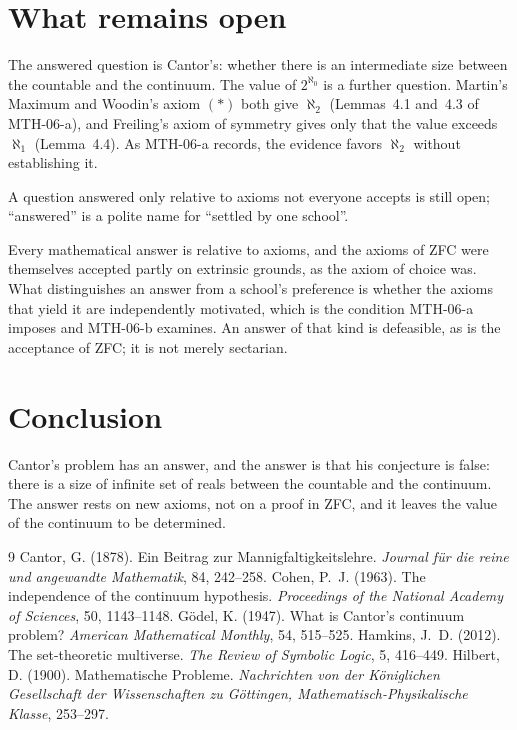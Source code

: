 \documentclass{situationist-preprint}
\begin{document}
\section{What remains open}\label{s:open}

The answered question is Cantor's: whether there is an intermediate size between the countable and the continuum. The value of $2^{\aleph_0}$ is a further question. Martin's Maximum and Woodin's axiom $(*)$ both give $\aleph_2$ (Lemmas~4.1 and~4.3 of MTH-06-a), and Freiling's axiom of symmetry gives only that the value exceeds $\aleph_1$ (Lemma~4.4). As MTH-06-a records, the evidence favors $\aleph_2$ without establishing it.

\begin{objection}
A question answered only relative to axioms not everyone accepts is still open; \enquote{answered} is a polite name for \enquote{settled by one school}.
\end{objection}

\begin{reply}
Every mathematical answer is relative to axioms, and the axioms of ZFC were themselves accepted partly on extrinsic grounds, as the axiom of choice was. What distinguishes an answer from a school's preference is whether the axioms that yield it are independently motivated, which is the condition MTH-06-a imposes and MTH-06-b examines. An answer of that kind is defeasible, as is the acceptance of ZFC; it is not merely sectarian.
\end{reply}

\section{Conclusion}

Cantor's problem has an answer, and the answer is that his conjecture is false: there is a size of infinite set of reals between the countable and the continuum. The answer rests on new axioms, not on a proof in ZFC, and it leaves the value of the continuum to be determined.

\begin{thebibliography}{9}\small
{} Cantor, G. (1878). Ein Beitrag zur Mannigfaltigkeitslehre. \emph{Journal f\"ur die reine und angewandte Mathematik}, 84, 242--258.
 Cohen, P.~J. (1963). The independence of the continuum hypothesis. \emph{Proceedings of the National Academy of Sciences}, 50, 1143--1148.
 G\"odel, K. (1947). What is Cantor's continuum problem? \emph{American Mathematical Monthly}, 54, 515--525.
 Hamkins, J.~D. (2012). The set-theoretic multiverse. \emph{The Review of Symbolic Logic}, 5, 416--449.
 Hilbert, D. (1900). Mathematische Probleme. \emph{Nachrichten von der K\"oniglichen Gesellschaft der Wissenschaften zu G\"ottingen, Mathematisch-Physikalische Klasse}, 253--297.
\end{thebibliography}
\end{document}

